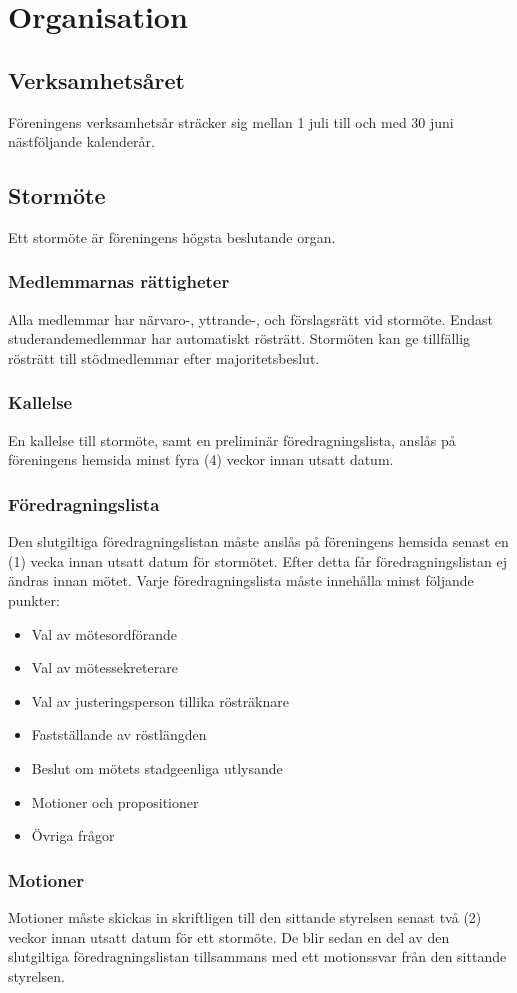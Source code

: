 \documentclass[11pt,a4paper]{article}
\begin{document}
\section{Organisation}
\subsection{Verksamhetsåret}
Föreningens verksamhetsår sträcker sig mellan 1 juli till och med 30 juni nästföljande kalenderår.
\subsection{Stormöte}
Ett stormöte är föreningens högsta beslutande organ.
\subsubsection{Medlemmarnas rättigheter}
Alla medlemmar har närvaro-, yttrande-, och förslagsrätt vid stormöte. Endast studerandemedlemmar har automatiskt rösträtt.
Stormöten kan ge  tillfällig rösträtt till stödmedlemmar efter majoritetsbeslut.
\subsubsection{Kallelse}\label{sec:kallelse}
En kallelse till stormöte, samt en preliminär föredragningslista, anslås på föreningens hemsida minst fyra (4) veckor innan utsatt datum.
\subsubsection{Föredragningslista}\label{sec:dagordning}
Den slutgiltiga föredragningslistan måste anslås på föreningens hemsida senast en (1) vecka innan utsatt datum för stormötet. Efter detta får föredragningslistan ej ändras innan mötet. Varje föredragningslista måste innehålla minst följande punkter:
\begin{itemize}
	\item Val av mötesordförande
	\item Val av mötessekreterare
	\item Val av justeringsperson tillika rösträknare
	\item Fastställande av röstlängden
	\item Beslut om mötets stadgeenliga utlysande
	\item Motioner och propositioner
	\item Övriga frågor
\end{itemize}
\subsubsection{Motioner}
Motioner måste skickas in skriftligen till den sittande styrelsen senast två (2) veckor innan utsatt datum för ett stormöte. De blir sedan en del av den slutgiltiga föredragningslistan tillsammans med ett motionssvar från den sittande styrelsen.
\end{document}

